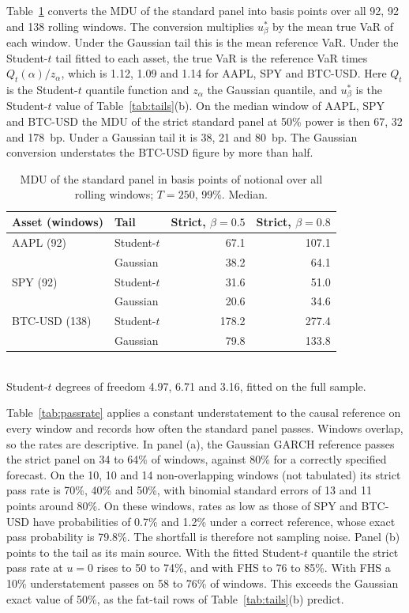 \documentclass[11pt]{article}
\begin{document}
Table~\ref{tab:bps} converts the MDU of the standard panel into basis points
over all 92, 92 and 138 rolling windows. The conversion multiplies $u^*_\beta$
by the mean true VaR of each window. Under the Gaussian tail this is the mean
reference VaR. Under the Student-$t$ tail fitted to each asset, the true VaR is
the reference VaR times $Q_t(\alpha)/z_\alpha$, which is 1.12, 1.09 and 1.14
for AAPL, SPY and BTC-USD. Here $Q_t$ is the Student-$t$ quantile function and $z_\alpha$ the Gaussian
quantile, and $u^*_\beta$ is the Student-$t$ value of Table~\ref{tab:tails}(b).
On the median window of AAPL, SPY and BTC-USD the MDU of the strict standard
panel at 50\% power is then 67, 32 and 178~bp. Under a Gaussian tail it is 38,
21 and 80~bp. The Gaussian conversion understates the BTC-USD figure by more
than half.

\begin{table}[tbp]
\caption{MDU of the standard panel in basis points of notional over all rolling
windows; $T = 250$, 99\%. Median.}
\label{tab:bps}
\small
\centering
\setlength{\tabcolsep}{4pt}
\begin{tabular}{llrr}
\toprule
Asset (windows) & Tail & Strict, $\beta = 0.5$ & Strict, $\beta = 0.8$ \\
\midrule
AAPL (92) & Student-$t$ & 67.1 & 107.1 \\
 & Gaussian & 38.2 & 64.1 \\
SPY (92) & Student-$t$ & 31.6 & 51.0 \\
 & Gaussian & 20.6 & 34.6 \\
BTC-USD (138) & Student-$t$ & 178.2 & 277.4 \\
 & Gaussian & 79.8 & 133.8 \\
\bottomrule
\end{tabular}
\\[2pt]
\footnotesize Student-$t$ degrees of freedom 4.97, 6.71 and 3.16, fitted on the full sample.
\end{table}

Table~\ref{tab:passrate} applies a constant understatement to the causal
reference on every window and records how often the standard panel passes.
Windows overlap, so the rates are descriptive. In panel (a), the Gaussian
GARCH reference passes the strict panel on 34 to 64\% of windows, against 80\%
for a correctly specified forecast. On the 10, 10 and 14 non-overlapping
windows (not tabulated) its strict pass rate is 70\%, 40\% and 50\%, with
binomial standard errors of 13 and 11 points around 80\%. On these windows,
rates as low as those of SPY and BTC-USD have probabilities of 0.7\% and
1.2\% under a correct reference, whose exact pass probability is 79.8\%. The
shortfall is therefore not sampling noise. Panel (b) points to the tail as its main
source. With the fitted Student-$t$ quantile the strict pass rate at $u = 0$
rises to 50 to 74\%, and with FHS to 76 to 85\%. With FHS a 10\% understatement
passes on 58 to 76\% of windows. This exceeds the Gaussian exact value of 50\%,
as the fat-tail rows of Table~\ref{tab:tails}(b) predict.
\end{document}

